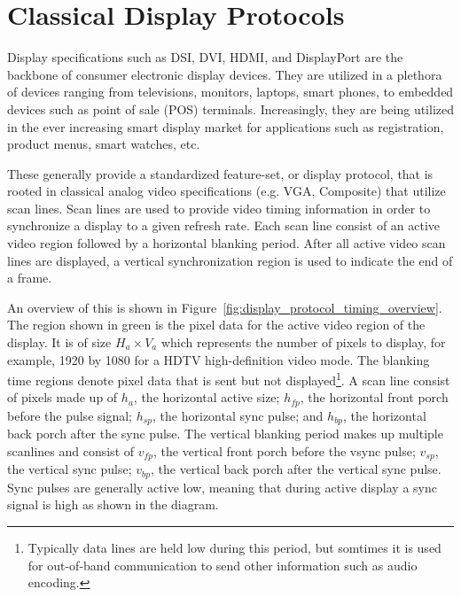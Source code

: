 \section{Classical Display Protocols}
    \label{sec:classical_display_protocols}

    Display specifications such as DSI\cite{HDMIForum2017}, DVI\cite{DDWG1999}, HDMI\cite{HDMIForum2018}, and DisplayPort\cite{VESA2016} are the backbone of consumer electronic display devices. They are utilized in a plethora of devices ranging from televisions, monitors, laptops, smart phones, to embedded devices such as point of sale (POS) terminals. Increasingly, they are being utilized in the ever increasing smart display market for applications such as registration, product menus, smart watches, etc.

    These generally provide a standardized feature-set, or display protocol, that is rooted in classical analog video specifications (e.g. VGA, Composite)\cite{NIAnalog} that utilize scan lines\cite{Neal1998}. Scan lines are used to provide video timing information in order to synchronize a display to a given refresh rate. Each scan line consist of an active video region followed by a horizontal blanking period. After all active video scan lines are displayed, a vertical synchronization region is used to indicate the end of a frame.


    An overview of this is shown in Figure~\ref{fig:display_protocol_timing_overview}. The region shown in green is the pixel data for the active video region of the display. It is of size $H_a\times V_a$ which represents the number of pixels to display, for example, 1920 by 1080 for a HDTV high-definition video mode\cite{MythTVWebsite}. The blanking time regions denote pixel data that is sent but not displayed\footnote{Typically data lines are held low during this period, but somtimes it is used for out-of-band communication to send other information such as audio encoding.}. A scan line consist of pixels made up of $h_a$, the horizontal active size; $h_{fp}$, the horizontal front porch before the pulse signal; $h_{sp}$, the horizontal sync pulse; and $h_{bp}$, the horizontal back porch after the sync pulse. The vertical blanking period makes up multiple scanlines and consist of $v_{fp}$, the vertical front porch before the vsync pulse; $v_{sp}$, the vertical sync pulse; $v_{bp}$, the vertical back porch after the vertical sync pulse. Sync pulses are generally active low, meaning that during active display a sync signal is high as shown in the diagram.

